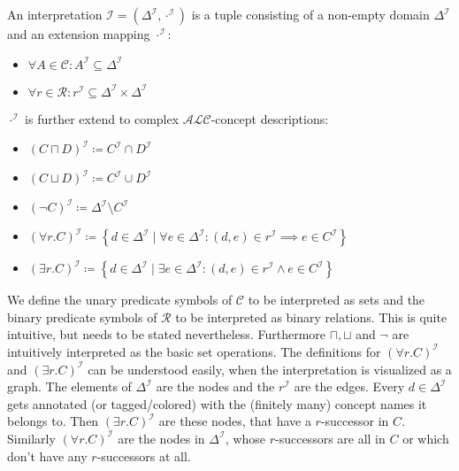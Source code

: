 \begin{definition}
	An interpretation $\mathcal{I} = (\Delta^{\mathcal{I}}, \cdot^{\mathcal{I}})$ is a tuple consisting of 
	a non-empty domain $\Delta^{\mathcal{I}}$ and
	an extension mapping $\cdot^{\mathcal{I}}$:
	\begin{itemize}
		\item $\forall A \in \mathscr{C}\mathrel{:} A^{\mathcal{I}} \subseteq \Delta^{\mathcal{I}}$
		\item $\forall r \in \mathscr{R} \mathrel{:} r^{\mathcal{I}}\subseteq \Delta^{\mathcal{I}} \times \Delta^{\mathcal{I}}$
	\end{itemize}
	$\cdot^{\mathcal{I}}$ is further extend to complex $\mathcal{ALC}$-concept descriptions:
	\begin{itemize}
		\item $\left( C \sqcap D \right) ^{\mathcal{I}} \coloneqq C^{\mathcal{I}} \cap D^{\mathcal{I}}$
		\item $\left( C \sqcup D \right)^{\mathcal{I}} \coloneqq C^{\mathcal{I}} \cup D^{\mathcal{I}}$
		\item $\left( \neg C \right) ^{\mathcal{I}} \coloneqq \Delta ^{\mathcal{I}} \setminus C^{\mathcal{I}}$
		\item $\left( \forall r.C \right)^{\mathcal{I}} \coloneqq \left\{ d \in \Delta^{\mathcal{I}} \mid \forall e \in \Delta^{\mathcal{I}}\mathrel{:} (d,e) \in r^{\mathcal{I}} \implies e \in C^{\mathcal{I}} \right\} $
		\item $\left( \exists r.C \right)^{\mathcal{I}} \coloneqq \left\{ d \in \Delta^{\mathcal{I}} \mid \exists e \in \Delta^{\mathcal{I}}\mathrel{:} (d,e) \in r^{\mathcal{I}} \land e \in C^{\mathcal{I}} \right\} $
	\end{itemize}
\end{definition}
We define the unary predicate symbols of $\mathscr{C}$ to be interpreted as sets
and the binary predicate symbols of $\mathscr{R}$ to be interpreted as binary relations.
This is quite intuitive, but needs to be stated nevertheless.
Furthermore $\sqcap, \sqcup$ and $\neg$ are intuitively interpreted as the basic set operations.
The definitions for $\left( \forall r.C \right)^{\mathcal{I}}$ and $\left( \exists r.C \right)^{\mathcal{I}}$
can be understood easily, when the interpretation is visualized as a graph.
The elements of $\Delta^{\mathcal{I}}$ are the nodes and the $r^{\mathcal{I}}$ are the edges.
Every $d \in \Delta^{\mathcal{I}}$ gets annotated (or tagged/colored) with the (finitely many) concept names it belongs to.
Then $\left( \exists r.C \right)^{\mathcal{I}}$ are these nodes, that have a $r$-successor in $C$.
Similarly $\left( \forall r.C \right)^{\mathcal{I}}$ are the nodes in $\Delta^{\mathcal{I}}$, whose $r$-successors are all in $C$
or which don't have any $r$-successors at all.


